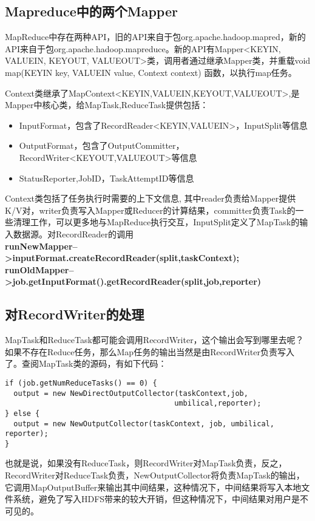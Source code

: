 \subsection{Mapreduce中的两个Mapper}
\par MapReduce中存在两种API，旧的API来自于包org.apache.hadoop.mapred，新的API来自于包org.apache.hadoop.mapreduce。新的API有Mapper<KEYIN, VALUEIN, KEYOUT, VALUEOUT>类，调用者通过继承Mapper类，并重载void map(KEYIN key, VALUEIN value, Context context) 函数，以执行map任务。
\par Context类继承了MapContext<KEYIN,VALUEIN,KEYOUT,VALUEOUT>,是Mapper中核心类，给MapTask,ReduceTask提供包括：
\begin{itemize}
\item InputFormat，包含了RecordReader<KEYIN,VALUEIN>，InputSplit等信息
\item OutputFormat，包含了OutputCommitter，RecordWriter<KEYOUT,VALUEOUT>等信息
\item StatusReporter,JobID，TaskAttemptID等信息
\end{itemize}
\par Context类包括了任务执行时需要的上下文信息, 其中reader负责给Mapper提供K/V对，writer负责写入Mapper或Reducer的计算结果，committer负责Task的一些清理工作，可以更多地与MapReduce执行交互，InputSplit定义了MapTask的输入数据源。对RecordReader的调用\\
\textbf{runNewMapper-->inputFormat.createRecordReader(split,taskContext);}\\
\textbf{runOldMapper-->job.getInputFormat().getRecordReader(split,job,reporter)}
\subsection{对RecordWriter的处理}
MapTask和ReduceTask都可能会调用RecordWriter，这个输出会写到哪里去呢？如果不存在Reduce任务，那么Map任务的输出当然是由RecordWriter负责写入了。查阅MapTask类的源码，有如下代码：
\begin{verbatim}
if (job.getNumReduceTasks() == 0) {
  output = new NewDirectOutputCollector(taskContext,job,
                                       umbilical,reporter);
} else {
  output = new NewOutputCollector(taskContext, job, umbilical, reporter);
}
\end{verbatim}
\par 也就是说，如果没有ReduceTask，则RecordWriter对MapTask负责，反之，RecordWriter对ReduceTask负责，NewOutputCollector将负责MapTask的输出，它调用MapOutputBuffer来输出其中间结果，这种情况下，中间结果将写入本地文件系统，避免了写入HDFS带来的较大开销，但这种情况下，中间结果对用户是不可见的。

